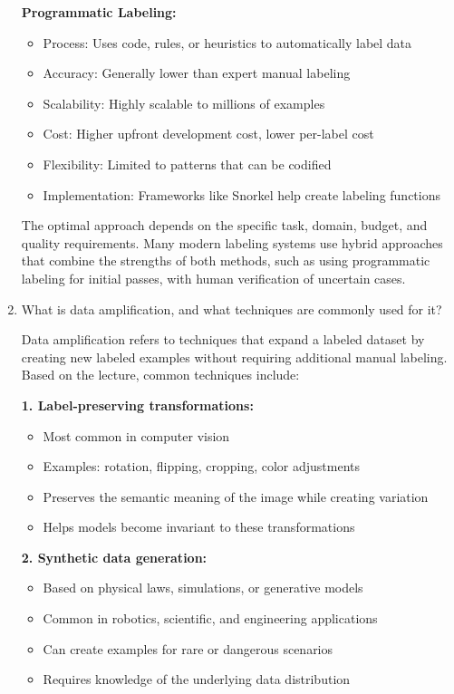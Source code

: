 \documentclass[12pt]{article}
\begin{document}
\begin{enumerate}
\begin{tcolorbox}[colback=blue!5!white,colframe=blue!75!black,title={Solution}]
    \textbf{Programmatic Labeling:}
    \begin{itemize}
        \item Process: Uses code, rules, or heuristics to automatically label data
        \item Accuracy: Generally lower than expert manual labeling
        \item Scalability: Highly scalable to millions of examples
        \item Cost: Higher upfront development cost, lower per-label cost
        \item Flexibility: Limited to patterns that can be codified
        \item Implementation: Frameworks like Snorkel help create labeling functions
    \end{itemize}
    
    The optimal approach depends on the specific task, domain, budget, and quality requirements. Many modern labeling systems use hybrid approaches that combine the strengths of both methods, such as using programmatic labeling for initial passes, with human verification of uncertain cases.
    \end{tcolorbox}
    
    \item What is data amplification, and what techniques are commonly used for it?
    
    \begin{tcolorbox}[colback=blue!5!white,colframe=blue!75!black,title={Solution}]
    Data amplification refers to techniques that expand a labeled dataset by creating new labeled examples without requiring additional manual labeling. Based on the lecture, common techniques include:
    
    \textbf{1. Label-preserving transformations:}
    \begin{itemize}
        \item Most common in computer vision
        \item Examples: rotation, flipping, cropping, color adjustments
        \item Preserves the semantic meaning of the image while creating variation
        \item Helps models become invariant to these transformations
    \end{itemize}
    
    \textbf{2. Synthetic data generation:}
    \begin{itemize}
        \item Based on physical laws, simulations, or generative models
        \item Common in robotics, scientific, and engineering applications
        \item Can create examples for rare or dangerous scenarios
        \item Requires knowledge of the underlying data distribution
    \end{itemize}
    

\end{tcolorbox}
\end{enumerate}
\end{document}

